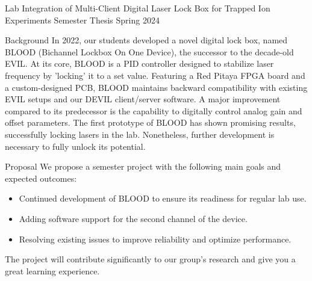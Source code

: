 \documentclass{project-proposal}
\begin{document}
\setmaintextfont
\makepage

\makeheader
{Lab Integration of Multi-​Client Digital Laser Lock Box for Trapped Ion Experiments} %
{Semester Thesis} %
{Spring 2024} %

\begin{section}{5.37cm}{Background}
 In 2022, our students developed a novel digital lock box, named BLOOD (Bichannel
 Lockbox On One Device), the successor to the decade-old EVIL. At its core, BLOOD is a
 PID controller designed to stabilize laser frequency by 'locking' it to a set value.
 Featuring a Red Pitaya FPGA board and a custom-designed PCB, BLOOD maintains backward
 compatibility with existing EVIL setups and our DEVIL client/server software. A major
 improvement compared to its predecessor is the capability to digitally control analog
 gain and offset parameters. The first prototype of BLOOD has shown promising results,
 successfully locking lasers in the lab. Nonetheless, further development is necessary
 to fully unlock its potential.
\end{section}

\begin{section}{}{Proposal}
 We propose a semester project with the following main goals and expected outcomes:

 \begin{itemize}
     \item {Continued development of BLOOD to ensure its readiness for regular lab use.}
     \item {Adding software support for the second channel of the device.}
     \item {Resolving existing issues to improve reliability and optimize performance.}
 \end{itemize}

 The project will contribute significantly to our group's research and
 give you a great learning experience.
\end{section}
\end{document}

